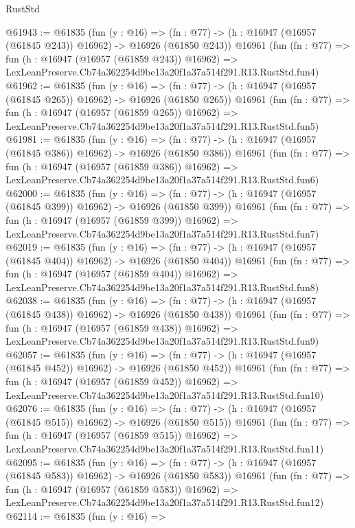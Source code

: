 \begin{lexlean}{RustStd}
\begin{coremodule}
@61943 := @61835
    (fun (y : @16) =>
    (fn : @77) -> (h : @16947 (@16957 (@61845 @243)) @16962) -> @16926 (@61850 @243))
    @16961
    (fun (fn : @77) =>
    fun (h : @16947 (@16957 (@61859 @243)) @16962) =>
    LexLeanPreserve.Cb74a362254d9be13a20f1a37a514f291.R13.RustStd.fun4)
@61962 := @61835
    (fun (y : @16) =>
    (fn : @77) -> (h : @16947 (@16957 (@61845 @265)) @16962) -> @16926 (@61850 @265))
    @16961
    (fun (fn : @77) =>
    fun (h : @16947 (@16957 (@61859 @265)) @16962) =>
    LexLeanPreserve.Cb74a362254d9be13a20f1a37a514f291.R13.RustStd.fun5)
@61981 := @61835
    (fun (y : @16) =>
    (fn : @77) -> (h : @16947 (@16957 (@61845 @386)) @16962) -> @16926 (@61850 @386))
    @16961
    (fun (fn : @77) =>
    fun (h : @16947 (@16957 (@61859 @386)) @16962) =>
    LexLeanPreserve.Cb74a362254d9be13a20f1a37a514f291.R13.RustStd.fun6)
@62000 := @61835
    (fun (y : @16) =>
    (fn : @77) -> (h : @16947 (@16957 (@61845 @399)) @16962) -> @16926 (@61850 @399))
    @16961
    (fun (fn : @77) =>
    fun (h : @16947 (@16957 (@61859 @399)) @16962) =>
    LexLeanPreserve.Cb74a362254d9be13a20f1a37a514f291.R13.RustStd.fun7)
@62019 := @61835
    (fun (y : @16) =>
    (fn : @77) -> (h : @16947 (@16957 (@61845 @404)) @16962) -> @16926 (@61850 @404))
    @16961
    (fun (fn : @77) =>
    fun (h : @16947 (@16957 (@61859 @404)) @16962) =>
    LexLeanPreserve.Cb74a362254d9be13a20f1a37a514f291.R13.RustStd.fun8)
@62038 := @61835
    (fun (y : @16) =>
    (fn : @77) -> (h : @16947 (@16957 (@61845 @438)) @16962) -> @16926 (@61850 @438))
    @16961
    (fun (fn : @77) =>
    fun (h : @16947 (@16957 (@61859 @438)) @16962) =>
    LexLeanPreserve.Cb74a362254d9be13a20f1a37a514f291.R13.RustStd.fun9)
@62057 := @61835
    (fun (y : @16) =>
    (fn : @77) -> (h : @16947 (@16957 (@61845 @452)) @16962) -> @16926 (@61850 @452))
    @16961
    (fun (fn : @77) =>
    fun (h : @16947 (@16957 (@61859 @452)) @16962) =>
    LexLeanPreserve.Cb74a362254d9be13a20f1a37a514f291.R13.RustStd.fun10)
@62076 := @61835
    (fun (y : @16) =>
    (fn : @77) -> (h : @16947 (@16957 (@61845 @515)) @16962) -> @16926 (@61850 @515))
    @16961
    (fun (fn : @77) =>
    fun (h : @16947 (@16957 (@61859 @515)) @16962) =>
    LexLeanPreserve.Cb74a362254d9be13a20f1a37a514f291.R13.RustStd.fun11)
@62095 := @61835
    (fun (y : @16) =>
    (fn : @77) -> (h : @16947 (@16957 (@61845 @583)) @16962) -> @16926 (@61850 @583))
    @16961
    (fun (fn : @77) =>
    fun (h : @16947 (@16957 (@61859 @583)) @16962) =>
    LexLeanPreserve.Cb74a362254d9be13a20f1a37a514f291.R13.RustStd.fun12)
@62114 := @61835
    (fun (y : @16) =>

\end{coremodule}
\end{lexlean}
